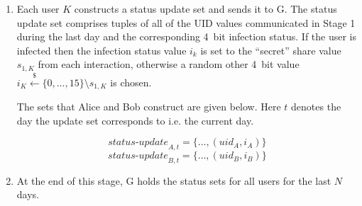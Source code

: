 \documentclass{article}
\newcommand\david[1]{\textcolor{red}{#1}}
\newcommand\chris[1]{\textcolor{blue}{#1}}
\begin{document}
\begin{enumerate}

    \item Each user $K$ constructs a status update set and sends it to G. The status update set comprises tuples of all of the UID values communicated in Stage 1 during the last day and the corresponding 4~bit infection status. If the user is infected then the infection status value $i_k$ is set to the ``secret'' share value $s_{1,K}$ from each interaction, otherwise a random other 4~bit value $i_K \xleftarrow{\$}\{0,\ldots,15\} \setminus s_{1,K}$ is chosen.
    
    The sets that Alice and Bob construct are given below. Here $t$ denotes the day the update set corresponds to i.e. the current day.
    
    $$\mathit{status\text{-}update}_{A,t} = \{\dots, (uid_A, i_A)\}$$
    $$\mathit{status\text{-}update}_{B,t} = \{\dots, (uid_B, i_B)\}$$
    
    \item At the end of this stage, G holds the status sets for all users for the last $N$ days.
    

    
    
    
    
\end{enumerate}
\end{document}
